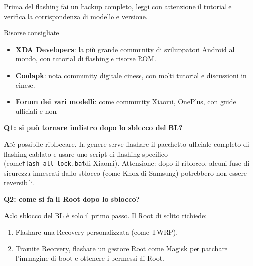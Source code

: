 Prima del flashing fai un backup completo, leggi con attenzione il tutorial e verifica la corrispondenza di modello e versione.

\begin{tcbinfo}{Risorse consigliate}
\begin{itemize}
  \item \textbf{XDA Developers}: la più grande community di sviluppatori Android al mondo, con tutorial di flashing e risorse ROM.
  \item \textbf{Coolapk}: nota community digitale cinese, con molti tutorial e discussioni in cinese.
  \item \textbf{Forum dei vari modelli}: come community Xiaomi, OnePlus, con guide ufficiali e non.
\end{itemize}

\end{tcbinfo}


\textbf{Q1: si può tornare indietro dopo lo sblocco del BL?}\par

\textbf{A:}è possibile ribloccare. In genere serve flashare il pacchetto ufficiale completo di flashing cablato e usare uno script di flashing specifico (come\texttt{flash\_all\_lock.\allowbreak bat}di Xiaomi). Attenzione: dopo il riblocco, alcuni fuse di sicurezza innescati dallo sblocco (come Knox di Samsung) potrebbero non essere reversibili.

\textbf{Q2: come si fa il Root dopo lo sblocco?}\par

\textbf{A:}lo sblocco del BL è solo il primo passo. Il Root di solito richiede:

\begin{enumerate}
  \item Flashare una Recovery personalizzata (come TWRP).
  \item Tramite Recovery, flashare un gestore Root come Magisk per patchare l'immagine di boot e ottenere i permessi di Root.
\end{enumerate}
